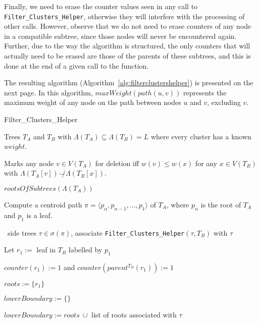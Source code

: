 \documentclass{article}
\newcommand{\compatible}{\smile}
\newcommand{\leafset}{\Lambda}
\begin{document}
    Finally, we need to erase the counter values seen in any call to \texttt{Filter\_Clusters\_Helper}, otherwise they will interfere with the processing of other calls. However, observe that we do not need to erase counters of any node in a compatible subtree, since those nodes will never be encountered again. Further, due to the way the algorithm is structured, the only counters that will actually need to be erased are those of the parents of these subtrees, and this is done at the end of a given call to the function.

    The resulting algorithm (Algorithm~\ref{alg:filterclustershelper}) is presented on the next page. In this algorithm, $maxWeight(path(u, v))$ represents the maximum weight of any node on the path between nodes $u$ and $v$, excluding $v$.

    \begin{algorithm}
        \caption{Filter\_Clusters\_Helper}
        \label{alg:filterclustershelper}

        \begin{algorithmic}[1]
            \Input Trees $T_A$ and $T_B$ with $\leafset(T_A) \subseteq \leafset(T_B) = L$ where every cluster has a known $weight$.

            \SideEffect Marks any node $v \in V(T_A)$ for deletion iff $w(v) \leq w(x)$ for any $x \in V(T_B)$ with $\leafset(T_A[v]) \not\compatible \leafset(T_B[x])$.

            \Output $rootsOfSubtrees(\leafset(T_A))$

            \State Compute a centroid path $\pi = \langle p_{\alpha}, p_{\alpha - 1}, ..., p_1 \rangle$ of $T_A$, where $p_{\alpha}$ is the root of $T_A$ and $p_1$ is a leaf.

            \State \algorithmicforall\ side trees $\tau \in \sigma(\pi)$,
                associate \texttt{Filter\_Clusters\_Helper}$(\tau, T_B)$ with $\tau$

            \State Let $r_1 :=$ leaf in $T_B$ labelled by $p_1$

            \State $counter(r_1) := 1$ and $counter(parent^{T_B}(r_1)) := 1$

            \State $roots := \{r_1\}$

                \State $lowerBoundary := \{\}$

                    \State $lowerBoundary := roots\ \cup$ list of roots associated with $\tau$
                \EndFor


\end{algorithmic}
\end{algorithm}
\end{document}

